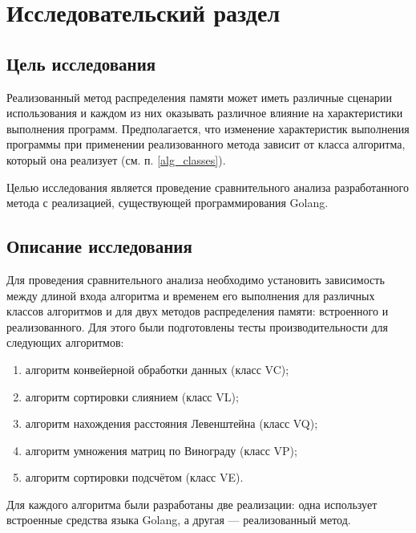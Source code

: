 \chapter{Исследовательский раздел}


\section{Цель исследования}

Реализованный метод распределения памяти может иметь различные сценарии использования и каждом из них оказывать различное влияние на характеристики выполнения программ. Предполагается, что изменение характеристик выполнения программы при применении реализованного метода зависит от класса алгоритма, который она реализует (см. п. \ref{alg_classes}).

Целью исследования является проведение сравнительного анализа разработанного метода с реализацией, существующей программирования Golang.

\section{Описание исследования}

Для проведения сравнительного анализа необходимо установить зависимость между длиной входа алгоритма и временем его выполнения для различных классов алгоритмов и для двух методов распределения памяти: встроенного и реализованного. Для этого были подготовлены тесты производительности для следующих алгоритмов:

\begin{enumerate}[label*=\arabic*)]
	\item алгоритм конвейерной обработки данных (класс VC);
	\item алгоритм сортировки слиянием (класс VL);
	\item алгоритм нахождения расстояния Левенштейна (класс VQ);
	\item алгоритм умножения матриц по Винограду (класс VP);
	\item алгоритм сортировки подсчётом (класс VE).
\end{enumerate}

Для каждого алгоритма были разработаны две реализации: одна использует встроенные средства языка Golang, а другая --- реализованный метод.



